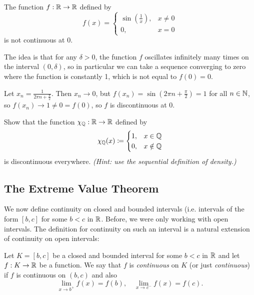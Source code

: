 \documentclass[../analysis1.tex]{subfiles}
\begin{document}
\begin{example}
    The function $f:\mathbb{R}\to\mathbb{R}$ defined by \[f(x)=\begin{cases}\sin\left(\frac{1}{x}\right),& x\ne 0\\ 0, & x=0\end{cases}\]is not continuous at $0$.
    \begin{center}
    \end{center}
    The idea is that for any $\delta>0$, the function $f$ oscillates infinitely many times on the interval $(0,\delta)$, so in particular we can take a sequence converging to zero where the function is constantly 1, which is not equal to $f(0)=0$.\par
    Let $x_n=\frac{1}{2\pi n+\frac{\pi}{2}}$. Then $x_n\to 0$, but $f(x_n)=\sin\left(2\pi n+\frac{\pi}{2}\right)=1$ for all $n\in\mathbb{N}$, so $f(x_n)\to 1\neq 0 = f(0)$, so $f$ is discontinuous at 0.
\end{example}

\begin{exercise*}
    Show that the function $\chi_{\mathbb{Q}}:\mathbb{R}\to\mathbb{R}$ defined by \[\chi_{\mathbb{Q}}(x)\coloneqq\begin{cases}1,& x\in\mathbb{Q}\\ 0,& x\notin \mathbb{Q}\end{cases}\]
    is discontinuous everywhere. \textit{(Hint: use the sequential definition of density.)}
\end{exercise*}

\subsection{The Extreme Value Theorem}
We now define continuity on closed and bounded intervals (i.e. intervals of the form $[b,c]$ for some $b<c$ in $\mathbb{R}$. Before, we were only working with open intervals. The definition for continuity on such an interval is a natural extension of continuity on open intervals:
\begin{definition}
    \begin{shaded*}
        Let $K=[b,c]$ be a closed and bounded interval for some $b<c$ in $\mathbb{R}$ and let $f:K\to\mathbb{R}$ be a function. We say that $f$ is \textit{continuous} on $K$ (or just \textit{continuous}) if $f$ is continuous on $(b,c)$ and also \[\lim_{x\to b^+}f(x)=f(b),\quad \lim_{x\to c^-}f(x)=f(c). \]
    \end{shaded*}
\end{definition}
\end{document}
